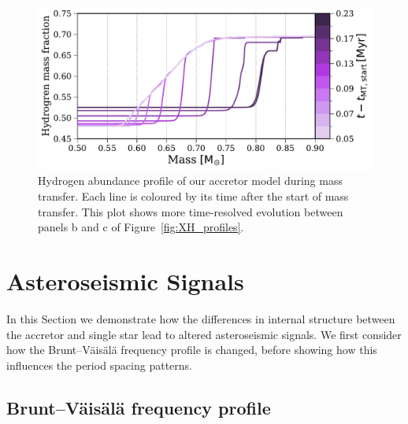 \documentclass[twocolumn, twocolappendix, oneside]{aastex631}
\newcommand{\bvf}{Brunt–Väisälä frequency\xspace}
\begin{document}
\begin{figure}[tb]
    \centering
    \includegraphics[width=\columnwidth]{figures/XH_profile_zoom_MT.pdf}
    \caption{Hydrogen abundance profile of our accretor model during mass transfer. Each line is coloured by its time after the start of mass transfer. This plot shows more time-resolved evolution between panels b and c of Figure~\ref{fig:XH_profiles}.}
    \label{fig:X_H_zoom_MT}
\end{figure}

\section{Asteroseismic Signals} \label{sec:results}

In this Section we demonstrate how the differences in internal structure between the accretor and single star lead to altered asteroseismic signals. We first consider how the \bvf profile is changed, before showing how this influences the period spacing patterns.

\subsection{\bvf profile}\label{sec:bvf}

\end{document}
